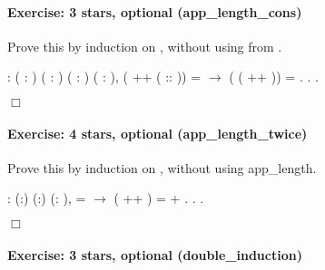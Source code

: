 \documentclass[12pt]{report}
\begin{document}
\paragraph{Exercise: 3 stars, optional (app\_length\_cons)}

 Prove this by induction on , without using 
    from . \begin{coqdoccode}
\coqdocemptyline
\coqdocnoindent
{}  : \coqdockw{\ensuremath{\forall}} ( : ) (  :  ) \coqdoceol
\coqdocindent{17.00em}
( : ) ( : ),\coqdoceol
\coqdocindent{2.50em}
 ( ++ ( :: )) =  \ensuremath{\rightarrow}\coqdoceol
\coqdocindent{2.50em}
 ( ( ++ )) = .\coqdoceol
\coqdocnoindent
{}.\coqdoceol
 .\coqdoceol
\end{coqdoccode}
\ensuremath{\Box} 

\paragraph{Exercise: 4 stars, optional (app\_length\_twice)}

 Prove this by induction on , without using app\_length. \begin{coqdoccode}
\coqdocemptyline
\coqdocnoindent
{}  : \coqdockw{\ensuremath{\forall}} (:) (:) (: ),\coqdoceol
\coqdocindent{2.50em}
  =  \ensuremath{\rightarrow}\coqdoceol
\coqdocindent{2.50em}
 ( ++ ) =  + .\coqdoceol
\coqdocnoindent
{}.\coqdoceol
 .\coqdoceol
\end{coqdoccode}
\ensuremath{\Box} 

\paragraph{Exercise: 3 stars, optional (double\_induction)}
\end{document}
